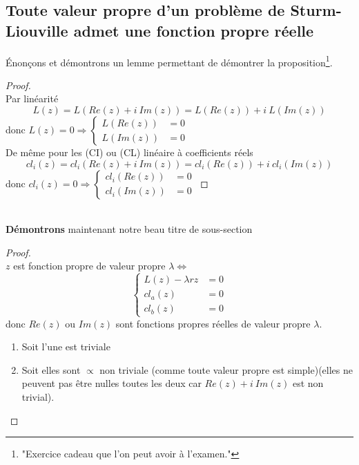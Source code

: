 \documentclass[11pt, a4paper, openany]{book}
\begin{document}
		\subsection{Toute valeur propre d'un problème de Sturm-Liouville admet une fonction propre réelle}
		Énonçons et démontrons un lemme permettant de démontrer la proposition\footnote{"Exercice cadeau que l'on peut avoir à l'examen."}.\\
		\begin{proof}
			\ \\
			Par linéarité
			\begin{equation}
				L(z) = L(Re(z) +i\ Im(z)) = L(Re(z)) +i\ L(Im(z))
			\end{equation}
			donc $L(z) = 0 \Rightarrow \left\{\begin{array}{ll}
			L(Re(z)) &=0\\
			L(Im(z)) &=0
			\end{array}\right.$\\
			De même pour les (CI) ou (CL) linéaire à coefficients réels
			\begin{equation}
				cl_i(z) = cl_i(Re(z) +i\ Im(z)) = cl_i(Re(z)) +i\ cl_i(Im(z))
			\end{equation}
			donc $cl_i(z) = 0 \Rightarrow \left\{\begin{array}{ll}
			cl_i(Re(z)) &=0\\
			cl_i(Im(z)) &=0
			\end{array}\right.$
		\end{proof}\ \\
													
		\newpage
		\textbf{Démontrons} maintenant notre beau titre de sous-section
		\begin{proof}
			\ \\
			$z$ est fonction propre de valeur propre $\lambda \Leftrightarrow$
			\begin{equation}
				\left\{\begin{array}{ll}
				L(z) - \lambda r z &=0\\
				cl_a(z) &=0\\
				cl_b(z) &=0
				\end{array}\right.
			\end{equation}
			donc $Re(z)$ ou $Im(z)$ sont fonctions propres réelles de valeur propre $\lambda$.
			\begin{enumerate}
				\item Soit l'une est triviale
				\item Soit elles sont $\propto$ non triviale (comme toute valeur propre est simple)(elles ne peuvent pas être nulles toutes les deux car $Re(z) + i\ Im(z)$ est non trivial).
			\end{enumerate}
		\end{proof}
													
\end{document}

